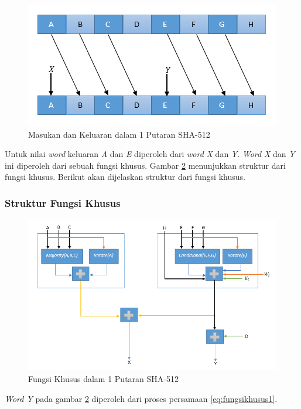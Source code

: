 \begin{figure}[H]
	\includegraphics[scale=0.8]{Gambar/sha_round}
	\centering
	\caption{Masukan dan Keluaran dalam 1 Putaran SHA-512}\label{fig:masukankeluaranword}
\end{figure}

Untuk nilai \textit{word} keluaran \textit{A} dan \textit{E} diperoleh dari \textit{word} \textit{X} dan \textit{Y}. \textit{Word} \textit{X} dan \textit{Y} ini diperoleh dari sebuah fungsi khusus. Gambar \ref{fig:fungsikhusus} menunjukkan struktur dari fungsi khusus. Berikut akan dijelaskan struktur dari fungsi khusus.

\subsubsection{Struktur Fungsi Khusus}

\begin{figure}[H]
	\includegraphics[scale=0.7]{Gambar/complex_function}
	\centering
	\caption{Fungsi Khusus dalam 1 Putaran SHA-512}\label{fig:fungsikhusus}
\end{figure}

\textit{Word Y} pada gambar \ref{fig:fungsikhusus} diperoleh dari proses persamaan \ref{eq:fungsikhusus1}.


